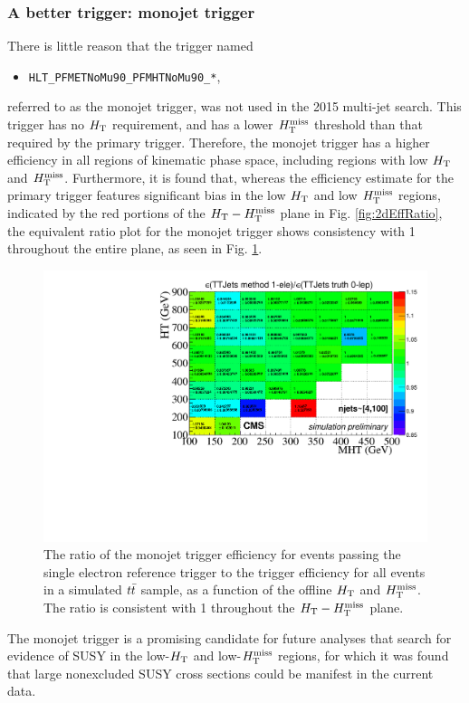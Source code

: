 \subsubsection{A better trigger: monojet trigger}
There is little reason that the trigger named
\begin{itemize}
  \item \texttt{HLT\_PFMETNoMu90\_PFMHTNoMu90\_*},
\end{itemize}
referred to as the monojet trigger,
was not used in the 2015 multi-jet search. This trigger has no $H_{\rm T}$ requirement, and has a lower $H_{\text{T}}^{\rm miss}$ threshold than that required by the primary trigger. Therefore, the monojet trigger has a higher efficiency in all regions of kinematic phase space, including regions with low $H_{\rm T}$ and $H_{\text{T}}^{\rm miss}$. Furthermore, it is found that, whereas the efficiency estimate for the primary trigger features significant bias in the low $H_{\rm T}$ and low $H_{\text{T}}^{\rm miss}$ regions, indicated by the red portions of the $H_{\rm T}-H_{\text{T}}^{\rm miss}$ plane in Fig. \ref{fig:2dEffRatio}, the equivalent ratio plot for the monojet trigger shows consistency with 1 throughout the entire plane, as seen in Fig. \ref{fig:2dMonoEffRatio}.
\begin{figure}[h]
  \begin{center}
    \includegraphics[width=0.95\linewidth]{figures/trigger/MonojetTrigger_EfficiencyRatioMC.pdf}
    \caption{
      The ratio of the monojet trigger efficiency for events passing the single
      electron reference trigger to the trigger efficiency for all
      events in a simulated $t\bar{t}$ sample, as a function of the offline $H_{\rm T}$
      and $H_{\text{T}}^{\rm miss}$. The ratio is consistent with 1 throughout the $H_{\rm T}-H_{\text{T}}^{\rm miss}$ plane.}
    \label{fig:2dMonoEffRatio}
  \end{center}
\end{figure}
\FloatBarrier
 \noindent
 The monojet trigger is a promising candidate for future analyses that search for evidence of SUSY in the low-$H_{\rm T}$ and low-$H_{\text{T}}^{\rm miss}$ regions, for which it was found that large nonexcluded SUSY cross sections could be manifest in the current data. 
 
